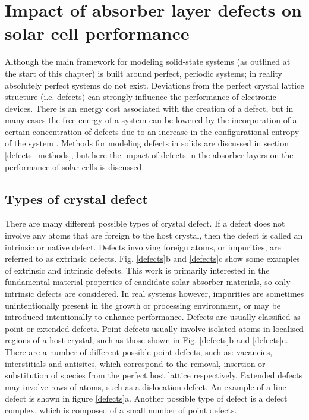 \documentclass[11pt, twoside]{report}
\begin{document}
\section{Impact of absorber layer defects on solar cell performance}\label{defects_impact}
Although the main framework for modeling solid-state systems (as outlined at the start of this chapter) is built around perfect, periodic systems; in reality absolutely perfect systems do not exist. Deviations from the perfect crystal lattice structure (i.e. defects) can strongly influence the performance of electronic devices. There is an energy cost associated with the creation of a defect, but in many cases the free energy of a system can be lowered by the incorporation of a certain concentration of defects due to an increase in the configurational entropy of the system \cite{AshcroftMermin_general}. Methods for modeling defects in solids are discussed in section \ref{defects_methods}, but here the impact of defects in the absorber layers on the performance of solar cells is discussed.

\subsection{Types of crystal defect}

There are many different possible types of crystal defect. If a defect does not involve any atoms that are foreign to the host crystal, then the defect is called an intrinsic or native defect. Defects involving foreign atoms, or impurities, are referred to as extrinsic defects. Fig. \ref{defects}b and \ref{defects}c show some examples of extrinsic and intrinsic defects. This work is primarily interested in the fundamental material properties of candidate solar absorber materials, so only intrinsic defects are considered. In real systems however, impurities are sometimes unintentionally present in the growth or processing environment, or may be introduced intentionally to enhance performance.
Defects are usually classified as point or extended defects. Point defects usually involve isolated atoms in localised regions of a host crystal, such as those shown in Fig. \ref{defects}b and \ref{defects}c. There are a number of different possible point defects, such as: vacancies, interstitials and antisites, which correspond to the removal, insertion or substitution of species from the perfect host lattice respectively. Extended defects may involve rows of atoms, such as a dislocation defect. An example of a line defect is shown in figure \ref{defects}a. Another possible type of defect is a defect complex, which is composed of a small number of point defects.
\end{document}
